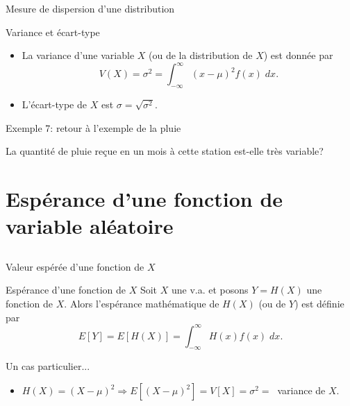 \documentclass[handout]{BeamerTemplate}
\begin{document}
\begin{frame}[t]{Mesure de dispersion d'une distribution}

\begin{Boite}{Variance et écart-type}
 \begin{itemize}
  \item La \alert{variance} d'une variable $X$ (ou de la distribution de $X$)
  est donnée par
  $$V(X)=\sigma^2=\int_{-\infty}^\infty (x-\mu)^2f(x)\;dx.$$
  \item L'\alert{écart-type} de $X$ est $\sigma=\sqrt{\sigma^2}$.
 \end{itemize}
\end{Boite}
\end{frame}

\begin{frame}[t]{Exemple 7: retour à l'exemple de la pluie}

La quantité de pluie reçue en un mois à cette station est-elle très variable?
\end{frame}

\section[Fonction de $X$]{Espérance d'une fonction de variable aléatoire }

\subsection*{ }

\begin{frame}[t]{Valeur espérée d'une fonction de $X$}

{\small
\begin{Boite}{Espérance d'une fonction de $X$}
 Soit $X$ une v.a. et posons $Y=H(X)$ une fonction
 de $X$. Alors l'\alert{espérance mathématique
 de $H(X)$} (ou de $Y$) est définie par
 $$E[Y]=E[H(X)]=\int_{-\infty}^\infty H(x)f(x)\;dx.$$
\end{Boite}
Un cas particulier...
\begin{itemize}
 \item $H(X)=(X-\mu)^2\Rightarrow E[(X-\mu)^2]=V[X]=\sigma^2=\;\;$variance de $X$.
\end{itemize}
}
\end{frame}
\end{document}
